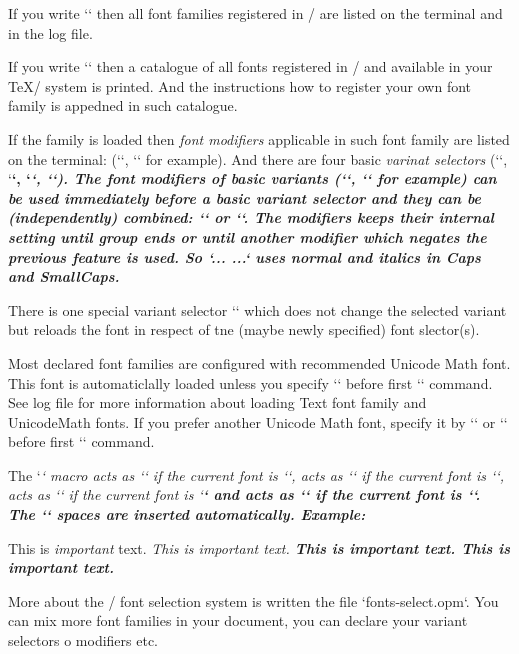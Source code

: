 If you write `\fontfam[?]` then all font families registered in \OpTeX/ 
are listed on the terminal and in the log file.

If you write `\fontfam[catalog]` then a catalogue of all fonts registered in
\OpTeX/ and available in your \TeX/ system is printed. And the instructions
how to register your own font family is appedned in such catalogue.

If the family is loaded then {\em font modifiers} applicable in such font family
are listed on the terminal: (`\caps`, `\cond` for example).
And there are four basic {\em varinat selectors} (`\rm`, `\bf`, `\it`, `\bi`).
The font modifiers of basic variants (`\caps`, `\cond` for example) can
be used immediately before a basic variant selector and they
can be (independently) combined: `\caps\it` or `\cond\caps\bf`. The
modifiers keeps their internal setting until group ends or until another
modifier which negates the previous feature is used. So
`\caps \rm... \it...`  uses normal and italics in Caps and SmallCaps.

\new
There is one special variant selector `\currvar` which does not change the
selected variant but reloads the font in respect of tne (maybe newly
specified) font slector(s).

\new Most declared font families are configured with recommended Unicode
Math font. This font is automaticlally loaded unless you specify
`\noloadmath` before first `\fontfam` command. See log file for more
information about loading Text font family and UnicodeMath fonts. If you
prefer another Unicode Math font, specify it by ``
or `` before first `\loadfam` command.

The `\em` macro acts as `\it` if the current font is `\rm`, acts as `\rm` if
the current font is `\it`, acts as `\bi` if the current font is `\bf` and
acts as `\bf` if the current font is `\bi`. The `\/` spaces are inserted
automatically. Example:

\begtt
This is {\em important} text.     %
\it This is {\em important} text. %
\bf This is {\em important} text. %
\bi This is {\em important} text. %
\endtt

\new
More about the \OpTeX/ font selection system is written the file
`fonts-select.opm`. You can mix more font families in your document, you can
declare your variant selectors o modifiers etc.

